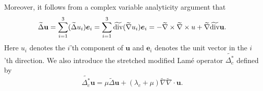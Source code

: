 \documentclass[11pt]{article}
\newcommand{\dive}{{\rm div}}
\newcommand{\na}{\nabla}
\newcommand{\la}{\lambda}
\newcommand{\De}{\Delta}
\newcommand{\wid}{\widetilde}
\newcommand{\bs}{\boldsymbol}
\begin{document}
Moreover, it follows from a complex variable analyticity argument \cite{BPT2010} that
\begin{equation}\label{stretched_laplace}
\wid{\Delta}\mathbf{u}=\sum_{i=1}^3(\wid{\Delta}u_i)\bs{e}_i
=\sum_{i=1}^3\wid{\dive}(\wid{\nabla}u_i)\bs{e}_i=- \wid{\nabla}\times\wid{\nabla}\times u
+\wid{\nabla} \wid{\dive}\mathbf{u}.
\end{equation}
Here $u_i$ denotes the $i$'th component of $\mathbf{u}$ and $\bs{e}_i$ denotes the unit vector 
in the $i$'th direction. We also introduce the stretched modified Lam\'{e} operator 
$\wid{\De_c^*}$ defined by
\begin{equation*}
\wid{\De_c^*}\mathbf{u}=\mu \wid{\De} \mathbf{u}+(\la_c +\mu)\wid{\na} \wid{\na} \cdot \mathbf{u}.
\end{equation*}
\end{document}
